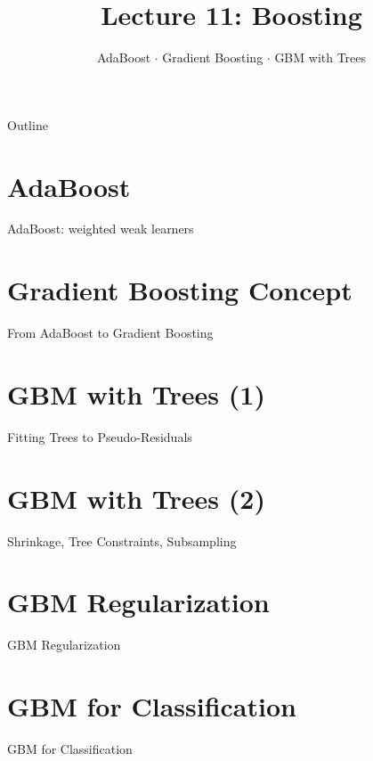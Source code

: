 \documentclass[aspectratio=169]{beamer}
\title{Lecture 11: Boosting}
\subtitle{AdaBoost $\cdot$ Gradient Boosting $\cdot$ GBM with Trees}
\date{}
\begin{document}
\begin{frame}\titlepage\end{frame}

\begin{frame}{Outline}
  \tableofcontents
\end{frame}

\section{AdaBoost}
\begin{frame}{AdaBoost: weighted weak learners}
\end{frame}

\section{Gradient Boosting Concept}
\begin{frame}{From AdaBoost to Gradient Boosting}
\end{frame}

\section{GBM with Trees (1)}
\begin{frame}{Fitting Trees to Pseudo-Residuals}
\end{frame}

\section{GBM with Trees (2)}
\begin{frame}{Shrinkage, Tree Constraints, Subsampling}
\end{frame}

\section{GBM Regularization}
\begin{frame}{GBM Regularization}
\end{frame}

\section{GBM for Classification}
\begin{frame}{GBM for Classification}
\end{frame}
\end{document}
